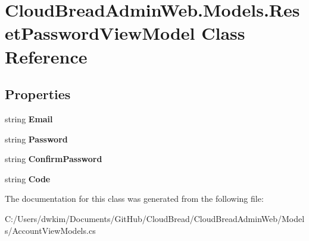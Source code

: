 \hypertarget{a00173}{}\section{Cloud\+Bread\+Admin\+Web.\+Models.\+Reset\+Password\+View\+Model Class Reference}
\label{a00173}
\subsection*{Properties}
\begin{DoxyCompactItemize}
\item 
string {\bfseries Email}\hypertarget{a00173_a17fc82cc36830f1c9e42cff09d76816e}{}\label{a00173_a17fc82cc36830f1c9e42cff09d76816e}

\item 
string {\bfseries Password}\hypertarget{a00173_a0fa7f59a57aeccf8b60e960fa086e3ef}{}\label{a00173_a0fa7f59a57aeccf8b60e960fa086e3ef}

\item 
string {\bfseries Confirm\+Password}\hypertarget{a00173_ac3eb6dcbf27043529eb479ce7a7ce7e7}{}\label{a00173_ac3eb6dcbf27043529eb479ce7a7ce7e7}

\item 
string {\bfseries Code}\hypertarget{a00173_a0a18c436f21a611decd287a98c779b5b}{}\label{a00173_a0a18c436f21a611decd287a98c779b5b}

\end{DoxyCompactItemize}


The documentation for this class was generated from the following file\+:\begin{DoxyCompactItemize}
\item 
C\+:/\+Users/dwkim/\+Documents/\+Git\+Hub/\+Cloud\+Bread/\+Cloud\+Bread\+Admin\+Web/\+Models/Account\+View\+Models.\+cs\end{DoxyCompactItemize}
